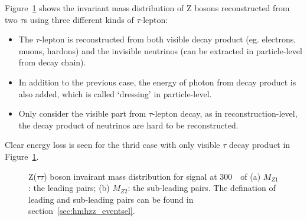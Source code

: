 Figure~\ref{fig:Ztt_mass} shows the invariant mass distribution of Z bosons reconstructed from two $\tau$s using three different kinds of $\tau$-lepton:
\begin{itemize}
	\item The $\tau$-lepton is reconstructed from both visible decay product (eg. electrons, muons, hardons) and the invisible neutrinos (can be extracted in particle-level from decay chain).
	\item In addition to the previous case, the energy of photon from decay product is also added, which is called `dressing' in particle-level.
	\item Only consider the visible part from $\tau$-lepton decay, as in reconstruction-level, the decay product of neutrinos are hard to be reconstructed.
\end{itemize} 
Clear energy loss is seen for the thrid case with only visible $\tau$ decay product in Figure~\ref{fig:Ztt_mass}.
\begin{figure}[!htbp]
\centering
{}
\caption{
Z(\rightarrow $\tau\tau$) boson invairant mass distribution for signal at 300~\gev~of
(a) $M_{Z1}$: the leading pairs;
(b) $M_{Z2}$: the sub-leading pairs.
The defination of leading and sub-leading pairs can be found in section~\ref{sec:hmhzz_eventsel}.
}
\label{fig:Ztt_mass}
\end{figure}

